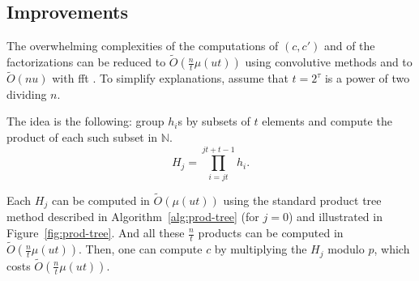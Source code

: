 \documentclass[11pt]{llncs}
\newcommand{\Oapp}{\ensuremath{\tilde{O}}}
\begin{document}
\subsection{Improvements}

The overwhelming complexities of the computations of $(c,c')$ and of the factorizations can be reduced to $\Oapp(\frac{n}{t} \mu(u t))$ using convolutive methods and to $\Oapp(n u)$ with {\sc fft} \cite{schonhage1971schnelle}. To simplify explanations, assume that $t=2^\tau$ is a power of two dividing $n$.

The idea is the following: group $h_i$s by subsets of $t$ elements and compute the product of each such subset in $\mathbb{N}$.
\[ H_j = \prod_{i=j t}^{j t + t - 1} h_i. \]

Each $H_j$ can be computed in $\Oapp(\mu(u t))$ using the standard product tree method described in Algorithm~\ref{alg:prod-tree} (for $j=0$) and illustrated in Figure~\ref{fig:prod-tree}.
And all these $\frac{n}{t}$ products can be computed in $\Oapp(\frac{n}{t} \mu(u t))$. Then, one can compute $c$ by multiplying the $H_j$ modulo $p$, which costs $\Oapp(\frac{n}{t} \mu(u t))$.

\newpage
\end{document}
